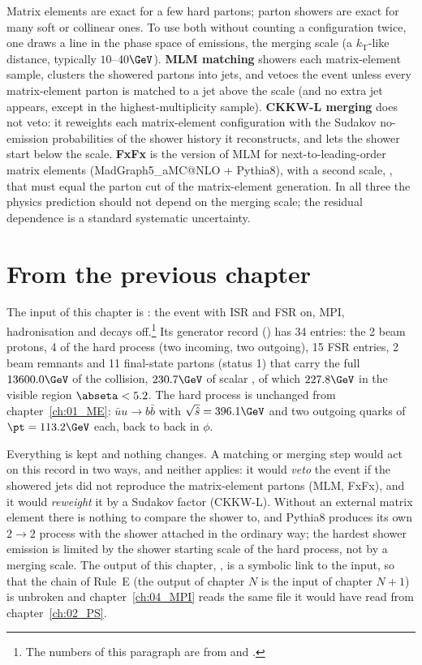 \begin{plainwords}
Matrix elements are exact for a few hard partons; parton showers are exact for many soft or collinear ones. To use
both without counting a configuration twice, one draws a line in the phase space of emissions, the merging scale
(a $k_{\mathrm{T}}$-like distance, typically $10$--$40\GeV$). \textbf{MLM matching} showers each matrix-element
sample, clusters the showered partons into jets, and vetoes the event unless every matrix-element parton is matched
to a jet above the scale (and no extra jet appears, except in the highest-multiplicity sample). \textbf{CKKW-L
merging} does not veto: it reweights each matrix-element configuration with the Sudakov no-emission probabilities of
the shower history it reconstructs, and lets the shower start below the scale. \textbf{FxFx} is the version of MLM
for next-to-leading-order matrix elements (MadGraph5\_aMC@NLO + Pythia8), with a second scale, , that
must equal the parton cut of the matrix-element generation. In all three the physics prediction should not depend on
the merging scale; the residual dependence is a standard systematic uncertainty.
\end{plainwords}

\section{From the previous chapter}

The input of this chapter is : the event with ISR and FSR on, MPI,
hadronisation and decays off.\footnote{The numbers of this paragraph are from 
and .} Its generator record () has 34 entries: the 2
beam protons, 4 of the hard process (two incoming, two outgoing), 15 FSR entries, 2 beam remnants and 11 final-state
partons (status 1) that carry the full $13600.0\GeV$ of the collision, $230.7\GeV$ of scalar \pt, of which $227.8\GeV$ in the visible
region $\abseta<5.2$. The hard process is unchanged from chapter~\ref{ch:01_ME}: $\bar{u}u\to b\bar{b}$ with
$\sqrt{\hat{s}}=396.1\GeV$ and two outgoing quarks of $\pt=113.2\GeV$ each, back to back in $\phi$.

Everything is kept and nothing changes. A matching or merging step would act on this record in two ways, and neither
applies: it would \emph{veto} the event if the showered jets did not reproduce the matrix-element partons (MLM, FxFx),
and it would \emph{reweight} it by a Sudakov factor (CKKW-L). Without an external matrix element there is nothing to
compare the shower to, and Pythia8 produces its own $2\to2$ process with the shower attached in the ordinary way; the
hardest shower emission is limited by the shower starting scale of the hard process, not by a merging scale. The
output of this chapter, , is a symbolic link to the input, so that the
chain of Rule~E (the output of chapter $N$ is the input of chapter $N+1$) is unbroken and chapter~\ref{ch:04_MPI} reads
the same file it would have read from chapter~\ref{ch:02_PS}.

